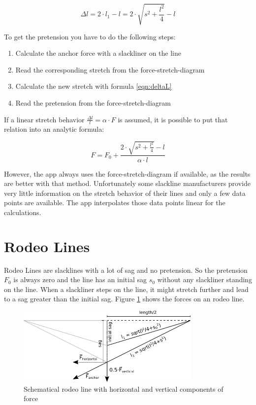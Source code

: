 \begin{equation}
	\Delta l = 2\cdot l_1 - l= 2\cdot \sqrt{s^2+\frac{l^2}{4}} - l
	\label{eqn:deltaL}
\end{equation}

To get the pretension you have to do the following steps:

\begin{enumerate}
	\item Calculate the anchor force with a slackliner on the line
	\item Read the corresponding stretch from the force-stretch-diagram
	\item Calculate the new stretch with formula \ref{eqn:deltaL}
	\item Read the pretension from the force-stretch-diagram
\end{enumerate}

If a linear stretch behavior $\frac{\Delta l}{l} = \alpha\cdot F$ is assumed, it is possible to put that relation into an analytic formula:

\begin{equation}
	F = F_0 + \frac{2\cdot \sqrt{s^2+\frac{l^2}{4}} - l}{\alpha\cdot l}
\end{equation}

However, the app always uses the force-stretch-diagram if available, as the results are better with that method.  Unfortunately some slackline manufacturers provide very little information on the stretch behavior of their lines and only a few data points are available. The app interpolates those data points linear for the calculations.

\section{Rodeo Lines}

Rodeo Lines are slacklines with a lot of sag and no pretension. So the pretension $F_0$ is always zero and the line has an initial sag $s_0$ without any slackliner standing on the line. When a slackliner steps on the line, it might stretch further and lead to a sag greater than the initial sag. Figure \ref{fig:RodeoLineWithForces} shows the forces on an rodeo line.

\begin{figure}[htb] \centering
	\includegraphics[width=0.8\textwidth]{images/rodeoLineWithForces.pdf}
	\caption{Schematical rodeo line with horizontal and vertical components of force}
	\label{fig:RodeoLineWithForces}
\end{figure}

